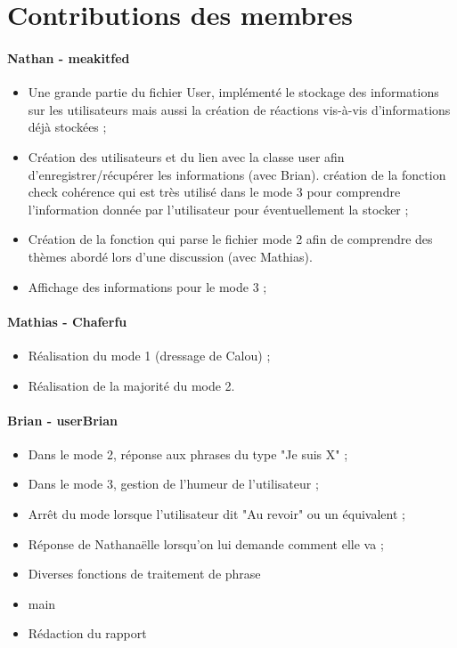 \documentclass[paper=a4, fontsize=11pt]{article}
\begin{document}
\vspace{0.5cm}

\section{Contributions des membres}

\paragraph{Nathan - meakitfed}
\begin{itemize}
\item Une grande partie du fichier User, implémenté le stockage des informations sur les utilisateurs mais aussi la création de réactions vis-à-vis d'informations déjà stockées ;
\item Création des utilisateurs et du lien avec la classe user afin d’enregistrer/récupérer les informations (avec Brian).
création de la fonction check cohérence qui est très utilisé dans le mode 3 pour comprendre l’information donnée par l’utilisateur pour éventuellement la stocker ;
\item Création de la fonction qui parse le fichier mode 2 afin de comprendre des thèmes abordé lors d’une discussion (avec Mathias).
\item Affichage des informations pour le mode 3 ;
\end{itemize}

\paragraph{Mathias - Chaferfu} 
\begin{itemize}
\item Réalisation du mode 1 (dressage de Calou) ;
\item Réalisation de la majorité du mode 2.
\end{itemize}

\paragraph{Brian - userBrian} 
\begin{itemize}
\item Dans le mode 2, réponse aux phrases du type "Je suis X" ;
\item Dans le mode 3, gestion de l'humeur de l'utilisateur ;
\item Arrêt du mode lorsque l'utilisateur dit "Au revoir" ou un équivalent ;
\item Réponse de Nathanaëlle lorsqu'on lui demande comment elle va ;
\item Diverses fonctions de traitement de phrase
\item main
\item Rédaction du rapport
\end{itemize}
\end{document}
